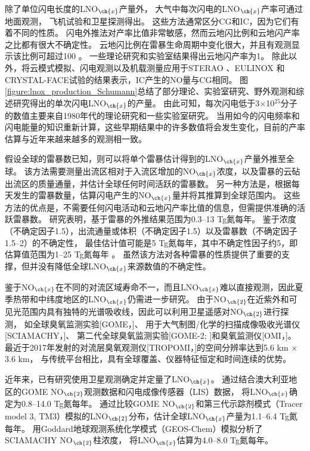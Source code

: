 除了单位闪电长度的LNO$_{\ch{x}}$产量外，
大气中每次闪电的LNO$_{\ch{x}}$产率可通过地面观测\citep{Noxon.1976}，
飞机试验\citep{Chameides.1987}和卫星探测\citep{Beirle.2004}得出。
这些方法通常区分CG和IC，因为它们有着不同的性质。
闪电外推法对产率比值非常敏感\citep{Bond.2002}，然而云地闪比例和云地闪产率之比都有很大不确定性。
云地闪比例在雷暴生命周期中变化很大，并且有观测显示该比例可超过100 \citep{Dye.2000,DeCaria.2005,Ott.2007}。
一些理论研究\citep{Cooray.1997}和实验室结果\citep{Cooray.2005}得出云地闪产率为1。
除此以外，将云模式模拟、闪电观测以及机载测量应用于STERAO \citep{DeCaria.2000}、EULINOX \citep{Fehr.2004}和CRYSTAL-FACE试验的结果表示，IC产生的NO量与CG相同。
图\ref{figure:lnox_production_Schumann}总结了部分理论、实验室研究、野外观测和综述研究得出的单次闪电LNO$_{\ch{x}}$的产量。
由此可知，每次闪电低于3$\times$10$^{25}$分子的数值主要来自1980年代的理论研究和一些实验室研究。
当用如今的闪电频率和闪电能量的知识重新计算，这些早期结果中的许多数值将会发生变化，目前的产率估算与近年来越来越多的观测相一致。

假设全球的雷暴数已知，则可以将单个雷暴估计得到的LNO$_{\ch{x}}$产量外推至全球\citep{Chameides.1987,Huntrieser.1998,Huntrieser.2002}。
该方法需要测量出流区相对于入流区增加的NO$_{\ch{x}}$浓度，以及雷暴的云砧出流区的质量通量，并估计全球任何时间活跃的雷暴数。
另一种方法是，根据每天发生的雷暴数量，估算闪电产生的NO$_{\ch{x}}$量并将其推算到全球范围内\citep{Ridley.2004}。 这些方法的优点是，不需要任何闪电活动和云地闪产率比值的信息，但需提供准确的活跃雷暴数。
研究表明，基于雷暴的外推结果范围为0.3--13 Tg氮每年。
鉴于浓度（不确定因子1.5），出流通量或体积（不确定因子1.5）以及雷暴数（不确定因子1.5--2）的不确定性，
最佳估计值可能是5 Tg氮每年，其中不确定性因子约5，即估算值范围为1--25 Tg氮每年 \citep{Chameides.1987}。
虽然该方法对各种雷暴的性质提供了重要的支撑，但并没有降低全球LNO$_{\ch{x}}$来源数值的不确定性。


鉴于NO$_{\ch{x}}$在不同的对流区域寿命不一，而且LNO$_{\ch{x}}$难以直接观测，因此夏季热带和中纬度地区的LNO$_{\ch{x}}$仍需进一步研究。
由于NO$_{\ch{2}}$在近紫外和可见光范围内具有独特的光谱吸收线，因此可以利用卫星遥感对NO$_{\ch{2}}$进行探测\citep{Platt.1983}，
如全球臭氧监测实验[GOME，\citet{Burrows.1999}]、
用于大气制图/化学的扫描成像吸收光谱仪[SCIAMACHY，\citet{Bovensmann.1999}]、
第二代全球臭氧监测实验[GOME-2; \citet{Callies.2000}]和臭氧监测仪[OMI，\citet{Levelt.2006}]。
最近于2017年发射的对流层臭氧观测仪[TROPOMI，\citet{Veefkind.2012}]的空间分辨率达到5.6 km $\times$ 3.6 km，
与传统平台相比，具有全球覆盖、仪器特征恒定和时间连续的优势。

近年来，已有研究使用卫星观测确定并定量了LNO$_{\ch{x}}$。
\citet{Beirle.2004}通过结合澳大利亚地区的GOME NO$_{\ch{2}}$观测数据和闪电成像传感器（LIS）数据，
将LNO$_{\ch{x}}$确定为0.8--14.0 Tg氮每年。
\citet{Boersma.2005}通过比较GOME NO$_{\ch{2}}$和第三代示踪剂模式（Tracer model 3, TM3）模拟的LNO$_{\ch{2}}$分布，估计全球LNO$_{\ch{x}}$产量为1.1--6.4 Tg氮每年。
\citet{Martin.2007a}用Goddard地球观测系统化学模式（GEOS-Chem）模拟分析了SCIAMACHY NO$_{\ch{2}}$柱浓度，
将LNO$_{\ch{x}}$估算为4.0--8.0 Tg氮每年。

